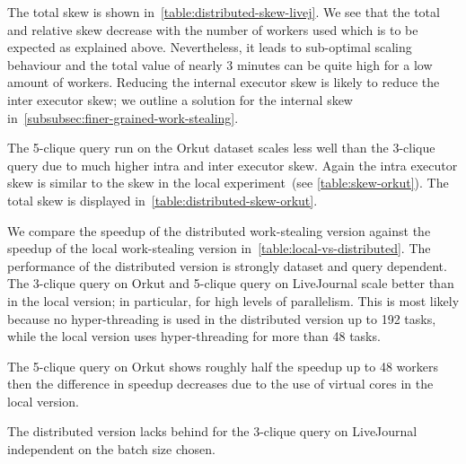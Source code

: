 The total skew is shown in~\cref{table:distributed-skew-livej}.
We see that the total and relative skew decrease with the number of workers used which is to be
expected as explained above.
Nevertheless, it leads to sub-optimal scaling behaviour and the total value of nearly 3 minutes
can be quite high for a low amount of workers.
Reducing the internal executor skew is likely to reduce the inter executor skew;
we outline a solution for the internal skew in~\cref{subsubsec:finer-grained-work-stealing}.

The 5-clique query run on the Orkut dataset scales less well than the 3-clique query due
to much higher intra and inter executor skew.
Again the intra executor skew is similar to the skew in the local experiment~(see \cref{table:skew-orkut}).
The total skew is displayed in~\cref{table:distributed-skew-orkut}.

We compare the speedup of the distributed work-stealing version against the speedup of the local
work-stealing version in~\cref{table:local-vs-distributed}.
The performance of the distributed version is strongly dataset and query dependent.
The 3-clique query on Orkut and 5-clique query on LiveJournal scale better than in the
local version;
in particular, for high levels of parallelism.
This is most likely because no hyper-threading is used in the distributed version
up to 192 tasks, while the local version uses hyper-threading for more than 48 tasks.

The 5-clique query on Orkut shows roughly half the speedup up to 48 workers then the difference
in speedup decreases due to the use of virtual cores in the local version.

The distributed version lacks behind for the 3-clique query on LiveJournal independent on
the batch size chosen.

